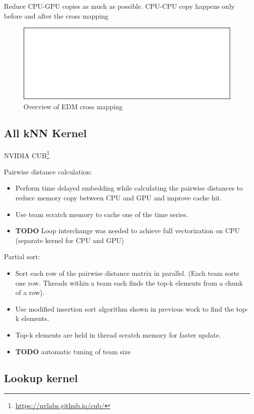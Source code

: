 \documentclass[conference]{IEEEtran}
\begin{document}
Reduce CPU-GPU copies as much as possible. CPU-CPU copy happens only before
and after the cross mapping

\begin{figure}
    \centering
    \includegraphics{figs/xmap_overview}
    \caption{Overview of EDM cross mapping}%
    \label{fig:architecture}
\end{figure}

\subsection{All kNN Kernel}

NVIDIA CUB\footnote{\url{https://nvlabs.github.io/cub/}}

Pairwise distance calculation:
\begin{itemize}
\item Perform time delayed embedding while calculating the pairwise distances
    to reduce memory copy between CPU and GPU and improve cache hit.
\item Use team scratch memory to cache one of the time series.
\item \textbf{TODO} Loop interchange was needed to achieve full vectorization
    on CPU (separate kernel for CPU and GPU)
\end{itemize}

Partial sort:
\begin{itemize}
\item Sort each row of the pairwise distance matrix in parallel. (Each team sorts one row. Threads within a team each finds the top-k elements from a chunk of a row).
\item Use modified insertion sort algorithm shown in previous work to find the top-k elements.
\item Top-k elements are held in thread scratch memory for faster update.
\item \textbf{TODO} automatic tuning of team size
\end{itemize}

\subsection{Lookup kernel}
\end{document}
